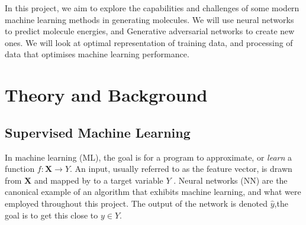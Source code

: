 \documentclass[12pt,a4paper]{article}
\begin{document}
In this project, we aim to explore the capabilities and challenges of some modern machine learning methods in generating molecules. We will use neural networks to predict molecule energies, and Generative adversarial networks to create new ones. We will look at optimal representation of training data, and processing of data that optimises machine learning performance.

\section{Theory and Background}
\subsection{Supervised Machine Learning} \label{subsec:sml}
In machine learning (ML), the goal is for a program to approximate, or \emph{learn} a function $f: \textbf{X} \to Y$. An input, usually referred to as the feature vector, is drawn from $\textbf{X}$ and mapped by to a target variable $Y$ \cite{goodfellow_deep_2016}. Neural networks (NN) are the canonical example of an algorithm that exhibits machine learning, and what were employed throughout this project. The output of the network is denoted $\hat{y}$,the goal is to get this close to  $y \in Y$. 
\end{document}
